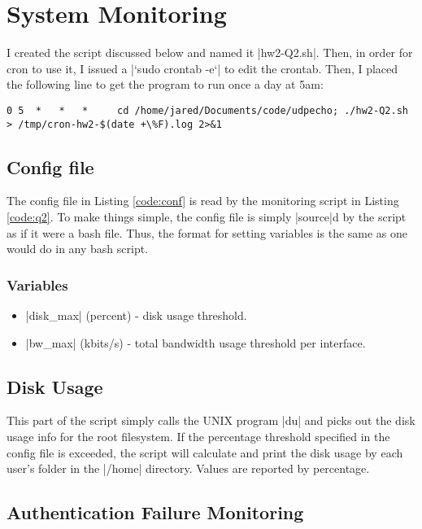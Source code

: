 \documentclass{article}
\begin{document}
\section{System Monitoring}

I created the script discussed below and named it |hw2-Q2.sh|. Then, in order
for cron to use it, I issued a |`sudo crontab -e`| to edit the crontab. Then,
I placed the following line to get the program to run once a day at 5am:

\begin{lstlisting}
0 5  *   *   *     cd /home/jared/Documents/code/udpecho; ./hw2-Q2.sh > /tmp/cron-hw2-$(date +\%F).log 2>&1
\end{lstlisting}

\subsection{Config file}

The config file in Listing \ref{code:conf} is read by the monitoring script in
Listing \ref{code:q2}. To make things simple, the config file is simply
|source|d by the script as if it were a bash file. Thus, the format for
setting variables is the same as one would do in any bash script.

\subsubsection{Variables}

\begin{itemize}
    \item |disk_max| (percent) - disk usage threshold.
    \item |bw_max| (kbits/s) - total bandwidth usage threshold per interface.
\end{itemize}

\subsection{Disk Usage}

This part of the script simply calls the UNIX program |du| and picks out the
disk usage info for the root filesystem. If the percentage threshold specified
in the config file is exceeded, the script will calculate and print the disk
usage by each user's folder in the |/home| directory. Values are reported by
percentage.

\subsection{Authentication Failure Monitoring}
\end{document}
